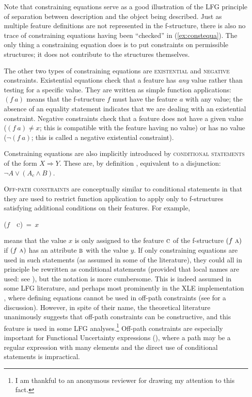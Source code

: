 \documentclass[output=paper,hidelinks]{langscibook}
\begin{document}
 Note that constraining equations serve as a good illustration of the LFG principle of separation between description and the object being described. Just as multiple feature definitions are not represented in the f-structure, there is also no trace of constraining equations having been ``checked'' in (\ref{ex:constequa}). The only thing a constraining equation does is to put constraints on permissible structures; it does not contribute to the structures themselves.
 
 The other two types of constraining equations are \textsc{existential} and \textsc{negative} constraints. Existential equations check that a feature has \textit{any} value rather than testing for a specific value. They are written as simple function applications: $(f\:a)$ means that the f-structure $f$ must have the feature $a$ with any value; the absence of an equality statement indicates that we are dealing with an existential constraint. Negative constraints check that a feature does not have a given value ($(f\:a) \neq x$; this is compatible with the feature having no value) or has no value ($\neg(f\:a)$; this is called a negative existential constraint).
 
 Constraining equations are also implicitly introduced by \textsc{conditional statements} of the form $X \Rightarrow Y$.  These are, by definition \parencites[61]{BresnanEtAl2016}[168]{DLM:LFG}, equivalent to a disjunction: $\neg A \vee (A_c \wedge B)$.

\textsc{Off-path constraints} are conceptually similar to conditional statements in that they are used to restrict function application to apply only to f-structures satisfying additional conditions on their features. For example, \begin{center}\mbox{($f$~\textsc{~\textsc{c}}) = $x$}\end{center} means that the value $x$ is only assigned to the feature $\textsc{c}$ of the f-structure $(f~\textsc{a})$ if $(f~\textsc{a})$ has an attribute $\textsc{b}$ with the value $y$. If only constraining equations are used in such statements (as assumed in some of the literature), they could all in principle be rewritten as conditional statements (provided that local names are used: see ), but the notation is more cumbersome. This is indeed assumed in some LFG literature, and perhaps most prominently in the XLE implementation \parencite{xledoc}, where defining equations cannot be used in off-path constraints (see \cite[7]{PatejukPrzepiorkowski2014} for a discussion). However, in spite of their name, the theoretical literature \parencites[65, fn. 26]{BresnanEtAl2016}[230]{DLM:LFG} unanimously suggests that off-path constraints can be constructive, and this feature is used in some LFG analyses.\footnote{I am thankful to an anonymous reviewer for drawing my attention to this fact.}  Off-path constraints are especially important for Functional Uncertainty expressions (), where a path may be a regular expression with many elements and the direct use of conditional statements is impractical.
 
\end{document}
